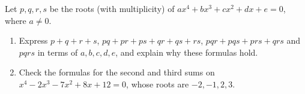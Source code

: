 Let $p,q,r,s$ be the roots (with multiplicity) of $ax^4+bx^3+cx^2+dx+e=0$, where $a\ne0$.
\begin{enumerate}
\item[(a)] Express $p+q+r+s$, $pq+pr+ps+qr+qs+rs$, $pqr+pqs+prs+qrs$ and $pqrs$ in terms of $a,b,c,d,e$, and explain why these formulas hold.
\item[(b)] Check the formulas for the second and third sums on $x^4-2x^3-7x^2+8x+12=0$, whose roots are $-2,-1,2,3$.
\end{enumerate}
